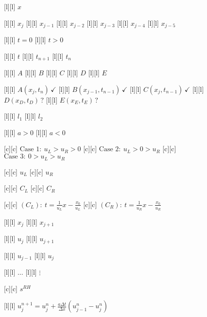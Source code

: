 \begin{figure}[ht]
	\centering
	\footnotesize

	[l] {$x$}

	[l] {$x_{j}$}
	[l] {$x_{j-1}$}
	[l] {$x_{j-2}$}
	[l] {$x_{j-3}$}
	[l] {$x_{j-4}$}
	[l] {$x_{j-5}$}


	[l] {$t=0$}
	[l] {$t>0$}

	[l] {$t$}
	[l] {$t_{n+1}$}
	[l] {$t_{n}$}

	[l] {$A$}
	[l] {$B$}
	[l] {$C$}
	[l] {$D$}
	[l] {$E$}

	[l] {$A(x_j,t_n)\,\checkmark$}
	[l] {$B(x_{j-1},t_{n-1})\,\checkmark$}
	[l] {$C(x_{j},t_{n-1})\,\checkmark$}
	[l] {$D(x_D,t_D)\,?$}
	[l] {$E(x_E,t_E)\, ?$}

	[l] {$l_1$}
	[l] {$l_2$}

	[l] {$a>0$}
	[l] {$a<0$}

	[c] {$\text{Case }1:\ u_{L} > u_{R} > 0$}
	[c] {$\text{Case }2:\ u_{L} > 0 > u_{R}$}
	[c] {$\text{Case }3:\ 0 > u_{L} > u_{R}$}

	[c] {$u_{L}$}
	[c] {$u_{R}$}

	[c] {$C_L$}
	[c] {$C_R$}

	[c] {$\displaystyle (C_L):\ t=\frac{1}{u_{L}}x-\frac{x_{0}}{u_{L}}$}
	[c] {$\displaystyle (C_R):\ t=\frac{1}{u_{R}}x-\frac{x_{0}}{u_{R}}$}

	[l] {$x_{j}$}
	[l] {$x_{j+1}$}

	[l] {$u_{j}$}
	[l] {$u_{j+1}$}

	[l] {$u_{j-1}$}
	[l] {$u_{j}$}

	[l] {$\dots$}
	[l] {$\vdots$}

	[c] {$s^{RH}$}

	[l] {$\displaystyle u_{j}^{n+1} = u_{j}^{n} + \frac{a\Delta t}{\Delta x}\left(u_{j-1}^{n}-u_{j}^{n}\right)$}


\end{figure}
